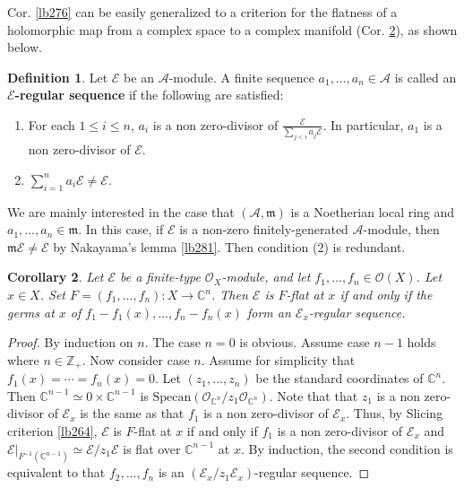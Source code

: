\documentclass[12pt,b5paper,notitlepage]{report}
\theoremstyle{definition}
\newtheorem{df}{Definition}[section]
\theoremstyle{plain}
\newtheorem{co}[df]{Corollary}
\newcommand{\mc}{\mathcal}
\newcommand{\scr}{\mathscr}
\newcommand{\Cbb}{\mathbb C}
\newcommand{\Zbb}{\mathbb Z}
\newcommand{\Specan}{\mathrm{Specan}}
\newcommand{\mk}{\mathfrak m}
\numberwithin{equation}{section}
\begin{document}
Cor. \ref{lb276} can be easily generalized to a criterion for the flatness of a holomorphic map from a complex space to a complex manifold (Cor. \ref{lb279}), as shown below.


\begin{df}
Let $\mc E$ be an $\mc A$-module. A finite sequence $a_1,\dots,a_n\in\mc A$ is called an \textbf{$\mc E$-regular sequence}  if the following are satisfied:
\begin{enumerate}[label=(\arabic*)]
\item For each $1\leq i\leq n$, $a_i$ is a non zero-divisor of $\displaystyle\frac{\mc E}{\sum_{j<i}a_j\mc E}$. In particular, $a_1$ is a non zero-divisor of $\mc E$.
\item $\sum_{i=1}^n a_i\mc E\neq \mc E$.
\end{enumerate}
\end{df}


We are mainly interested in the case that $(\mc A,\mk)$ is a Noetherian local ring and $a_1,\dots,a_n\in\mk$. In this case, if $\mc E$ is a non-zero finitely-generated $\mc A$-module, then $\mk\mc E\neq\mc E$ by Nakayama's lemma \ref{lb281}. Then condition (2) is redundant.


\begin{co}\label{lb279}
Let $\scr E$ be a finite-type $\scr O_X$-module, and let $f_1,\dots,f_n\in\scr O(X)$. Let $x\in X$. Set $F=(f_1,\dots,f_n):X\rightarrow\Cbb^n$. Then $\scr E$ is $F$-flat at $x$ if and only if the germs at $x$ of $f_1-f_1(x),\dots,f_n-f_n(x)$ form an $\scr E_x$-regular sequence.
\end{co}



\begin{proof}
By induction on $n$. The case $n=0$ is obvious. Assume case $n-1$ holds where $n\in\Zbb_+$. Now consider case $n$. Assume for simplicity that $f_1(x)=\cdots=f_n(x)=0$. Let $(z_1,\dots,z_n)$ be the standard coordinates of $\Cbb^n$. Then $\Cbb^{n-1}\simeq 0\times\Cbb^{n-1}$ is $\Specan(\scr O_{\Cbb^n}/z_1\scr O_{\Cbb^n})$. Note that that $z_1$ is a non zero-divisor of $\scr E_x$ is the same as that $f_1$ is a non zero-divisor of $\scr E_x$. Thus, by Slicing criterion \eqref{lb264}, $\scr E$ is $F$-flat at $x$ if and only if $f_1$ is a non zero-divisor of $\scr E_x$ and $\scr E|_{F^{-1}(\Cbb^{n-1})}\simeq\scr E/z_1\scr E$ is flat over $\Cbb^{n-1}$ at $x$. By induction, the second condition is equivalent to that $f_2,\dots,f_n$ is an $(\scr E_x/z_1\scr E_x)$-regular sequence.
\end{proof}
\end{document}
